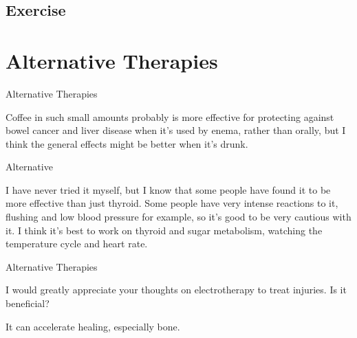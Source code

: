 \documentclass[11pt,oneside,openany,extrafontsizes]{memoir}
\begin{document}
\subsection{Exercise}

\section{Alternative Therapies}

\begin{standalonequote}{Alternative Therapies}

    \begin{answer}
        Coffee in such small amounts probably is more effective for protecting against bowel cancer and liver disease when it's used by enema, rather than orally, but I think the general effects might be better when it's drunk.
    \end{answer}
\end{standalonequote}

\begin{standalonequote}{Alternative}

    \begin{answer}
      I have never tried it myself, but I know that some people have found it to be more effective than just thyroid. Some people have very intense reactions to it, flushing and low blood pressure for example, so it's good to be very cautious with it. I think it's best to work on thyroid and sugar metabolism, watching the temperature cycle and heart rate.
    \end{answer}
\end{standalonequote}

\begin{qaexchange}{Alternative Therapies}

    \begin{question}
        I would greatly appreciate your thoughts on electrotherapy to treat injuries. Is it beneficial?
    \end{question}

    \begin{answer}
      It can accelerate healing, especially bone.
    \end{answer}
\end{qaexchange}
\end{document}
